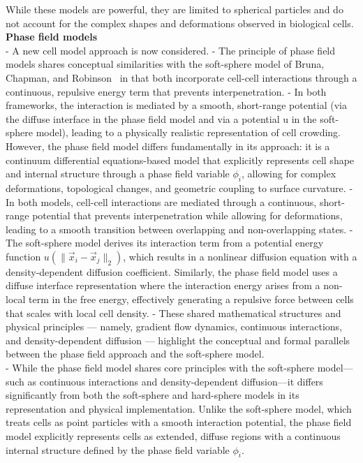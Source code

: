 While these models are powerful, they are limited to spherical particles and do not account for the complex shapes and deformations observed in biological cells.  \\


\textbf{Phase field models} \\

- A new cell model approach is now considered. 
- The principle of phase field models shares conceptual similarities with the soft-sphere model of Bruna, Chapman, and Robinson~\cite{BCR17} in that both incorporate cell-cell interactions through a continuous, repulsive energy term that prevents interpenetration. 
- In both frameworks, the interaction is mediated by a smooth, short-range potential (via the diffuse interface in the phase field model and via a potential 
u in the soft-sphere model), leading to a physically realistic representation of cell crowding. 
However, the phase field model differs fundamentally in its approach: it is a continuum differential equations-based model that explicitly represents cell shape and internal structure through a phase field variable $\phi_i$, allowing for complex deformations, topological changes, and geometric coupling to surface curvature. 
- In both models, cell-cell interactions are mediated through a continuous, short-range potential that prevents interpenetration while allowing for deformations, leading to a smooth transition between overlapping and non-overlapping states. 
- The soft-sphere model derives its interaction term from a potential energy function $u(\|\vec{x}_i - \vec{x}_j\|_2)$, which results in a nonlinear diffusion equation with a density-dependent diffusion coefficient. Similarly, the phase field model uses a diffuse interface representation where the interaction energy arises from a non-local term in the free energy, effectively generating a repulsive force between cells that scales with local cell density. 
- These shared mathematical structures and physical principles — namely, gradient flow dynamics, continuous interactions, and density-dependent diffusion — highlight the conceptual and formal parallels between the phase field approach and the soft-sphere model. \\
- While the phase field model shares core principles with the soft-sphere model—such as continuous interactions and density-dependent diffusion—it differs significantly from both the soft-sphere and hard-sphere models in its representation and physical implementation. 
Unlike the soft-sphere model, which treats cells as point particles with a smooth interaction potential, the phase field model explicitly represents cells as extended, diffuse regions with a continuous internal structure defined by the phase field variable $\phi_i$. \\

